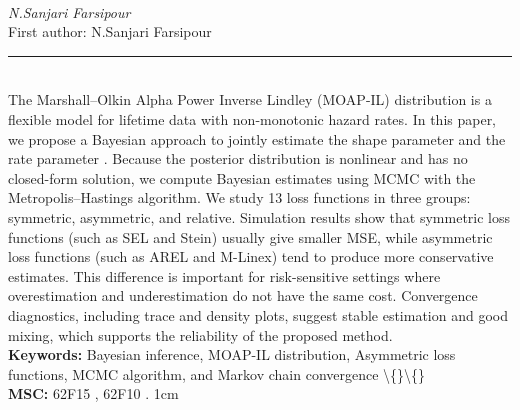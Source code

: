 \documentclass[10pt,twoside]{article}
\begin{document}
\noindent\begin{minipage}[t][\textheight]{\textwidth}
\\[0.35em]
{\itshape N.Sanjari Farsipour}\\[0.2em]
{\footnotesize First author: N.Sanjari Farsipour}\\[0.45em]
\noindent\rule{\textwidth}{0.3pt}\\[0.4em]
{\footnotesize  The Marshall--Olkin Alpha Power Inverse Lindley (MOAP-IL) distribution is a flexible model for lifetime data with non-monotonic hazard rates. In this paper, we propose a Bayesian approach to jointly estimate the shape parameter and the rate parameter . Because the posterior distribution is nonlinear and has no closed-form solution, we compute Bayesian estimates using MCMC with the Metropolis--Hastings algorithm. We study 13 loss functions in three groups: symmetric, asymmetric, and relative. Simulation results show that symmetric loss functions (such as SEL and Stein) usually give smaller MSE, while asymmetric loss functions (such as AREL and M-Linex) tend to produce more conservative estimates. This difference is important for risk-sensitive settings where overestimation and underestimation do not have the same cost. Convergence diagnostics, including trace and density plots, suggest stable estimation and good mixing, which supports the reliability of the proposed method.}\\[0.4em]
{\footnotesize\bfseries Keywords:} {\footnotesize Bayesian inference, MOAP-IL distribution, Asymmetric loss functions, MCMC algorithm, and Markov chain convergence \textbackslash\{\}\textbackslash\{\}}\\[0.15em]
{\footnotesize\bfseries MSC:} {\footnotesize 62F15 , 62F10 . 1cm}\\
\vfill
\end{minipage}
\newpage
\end{document}
